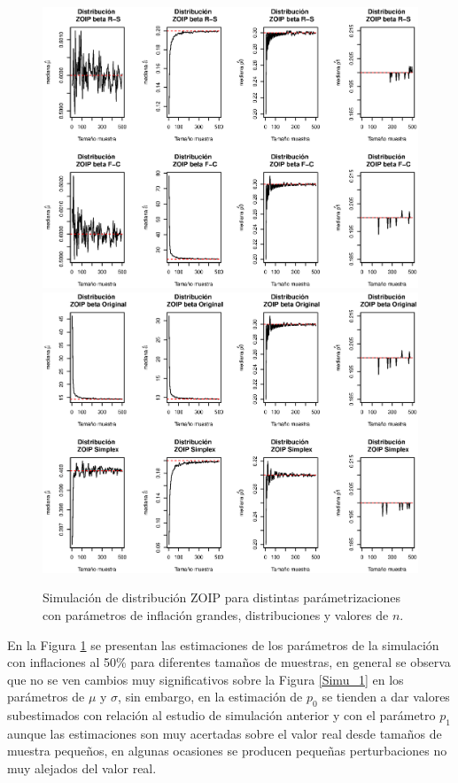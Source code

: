 \begin{figure}
	\begin{center}
		\includegraphics[scale=0.55]{Simulacion_RS_FC_Infla.eps}
		\quad
		\includegraphics[scale=0.55]{Simulacion_Ori_Sim_Infla.eps}	
		\caption{Simulaci\'{o}n de distribuci\'{o}n ZOIP para distintas par\'{a}metrizaciones con par\'{a}metros de inflaci\'{o}n grandes, distribuciones y valores de $n$.}
		\label{Simu_2}
	\end{center}
\end{figure}

En la Figura \ref{Simu_2} se presentan las estimaciones de los par\'{a}metros de la simulaci\'{o}n con inflaciones al 50\% para diferentes tama\~{n}os de muestras, en general se observa que no se ven cambios muy significativos sobre la Figura \ref{Simu_1} en los par\'{a}metros de $\mu$ y $\sigma$, sin embargo, en la estimaci\'{o}n de $p_0$ se tienden a dar valores subestimados con relaci\'{o}n al estudio de simulaci\'{o}n anterior y con el par\'{a}metro $p_1$ aunque las estimaciones son muy acertadas sobre el valor real desde tama\~{n}os de muestra peque\~{n}os, en algunas ocasiones se producen peque\~{n}as perturbaciones no muy alejados del valor real.


